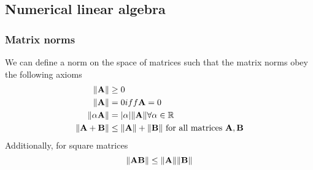 \documentclass{amsart}[12pt]
\begin{document}






\subsection{Numerical linear algebra}
\subsubsection{Matrix norms}
We can define a norm on the space of matrices such that the matrix norms obey the following axioms
\begin{align*}
	\|{\bf A}\| &\geq 0 \\
	\|{\bf A}\| &= 0 iff {\bf A} = 0 \\
	\|\alpha {\bf A}\| &= |\alpha| \|{\bf A}\| \forall \alpha \in {\mathbb{R}} \\
	\|{\bf A} + {\bf B}\| &\leq \|{\bf A}\| + \|{\bf B}\|\text{ for all matrices } {\bf A}, {\bf B}
\end{align*}
Additionally, for square matrices
\[
	\|{\bf A}{\bf B}\| \leq \|{\bf A}\| \|{\bf B}\|
\]
\end{document}

